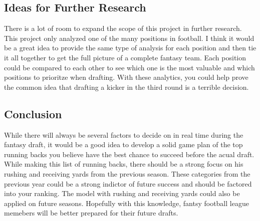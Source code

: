 \documentclass[]{article}
\begin{document}
\subsection{Ideas for Further
Research}\label{ideas-for-further-research}

There is a lot of room to expand the scope of this project in further
research. This project only analyzed one of the many positions in
football. I think it would be a great idea to provide the same type of
analysis for each position and then tie it all together to get the full
picture of a complete fantasy team. Each position could be compared to
each other to see which one is the most valuable and which positions to
prioritze when drafting. With these analytics, you could help prove the
common idea that drafting a kicker in the third round is a terrible
decision.

\subsection{Conclusion}\label{conclusion}

While there will always be several factors to decide on in real time
during the fantasy draft, it would be a good idea to develop a solid
game plan of the top running backs you believe have the best chance to
succeed before the acual draft. While making this list of running backs,
there should be a strong focus on his rushing and receiving yards from
the previous season. These categories from the previous year could be a
strong indictor of future success and should be factored into your
ranking. The model with rushing and receiving yards could also be
applied on future seasons. Hopefully with this knowledge, fantsy
football league memebers will be better prepared for their future
drafts.
\end{document}
